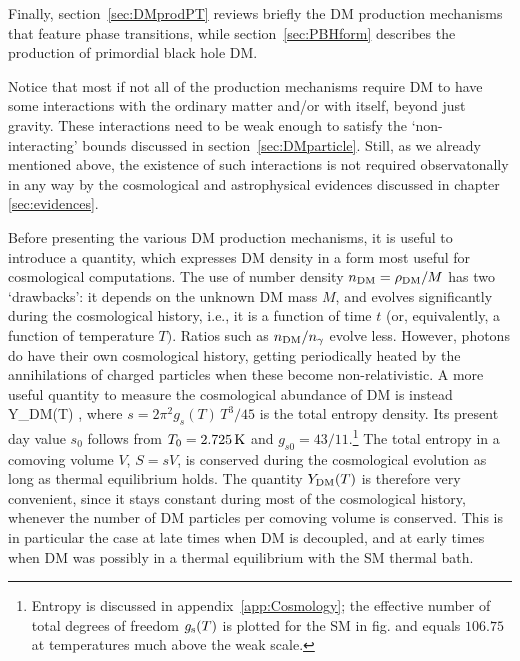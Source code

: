 Finally,  section~\ref{sec:DMprodPT} reviews briefly the DM production mechanisms that feature phase transitions, while  section~\ref{sec:PBHform} describes the production of primordial black hole DM.

\medskip

Notice that most if not all of the production mechanisms require DM to have some interactions with the ordinary matter and/or with itself, beyond just gravity.  
These interactions need to be weak enough to satisfy the `non-interacting' bounds discussed in section~\ref{sec:DMparticle}. 
Still, as we already mentioned above, the existence of such interactions is not required observatonally in any way by the cosmological and astrophysical evidences discussed in chapter \ref{sec:evidences}.

\medskip

Before presenting the various DM production mechanisms, it is useful to introduce a quantity, which expresses DM density
in a form most useful for cosmological computations.
The use of number density $n_{\rm DM} = \rho_{\rm DM}/M$ has two `drawbacks': it depends on the unknown DM mass $M$, and evolves significantly during the cosmological history, i.e., it is a function of  time $t$ (or, equivalently, a function of temperature $T)$.
Ratios such as $n_{\rm DM}/n_\gamma$ evolve less. 
However, photons do have their own cosmological history, getting periodically 
heated by the annihilations of charged particles when these become non-relativistic.
A more useful quantity to measure the cosmological abundance of DM
 is instead
\beq \label{eq:YDMdef}
 Y_{\rm DM}(T) \equiv  {},
 \eeq
where $s = 2\pi^2 g_{s}(T) \, T^3/45$ is the total entropy density. Its present day value $s_0$ follows from $T_0 = 2.725\,{\rm K}$ and $g_{s0} = {43}/{11}$.\footnote{Entropy is discussed in appendix~\ref{app:Cosmology};
the effective number of total degrees of freedom 
$g_{\rm s}(T)$ is plotted for the SM in  fig. and equals $106.75$ at temperatures much above the weak scale.}
The total entropy in a comoving volume $V$, $S = s V$, 
is conserved during the cosmological evolution as long as  thermal equilibrium holds. 
The quantity $Y_{\rm DM}(T)$ is therefore very convenient, since it stays constant during most of the cosmological history,
whenever the number of DM particles per comoving volume is conserved.
This is in particular the case at late times when DM is decoupled, and at early times when DM was  possibly in a thermal equilibrium with the SM thermal bath.
\label{DM cosmological abundance}


